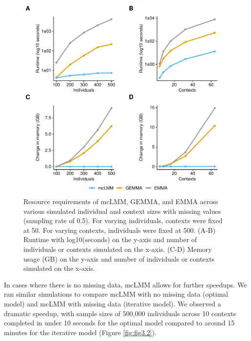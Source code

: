         \begin{figure}
            \centering
            \includegraphics[width=\textwidth]{chapter3/figures/Figure_1.pdf}
            \caption{Resource requirements of mcLMM, GEMMA, and EMMA across various simulated individual and context sizes with missing values (sampling rate of 0.5). For varying individuals, contexts were fixed at 50. For varying contexts, individuals were fixed at 500. (A-B) Runtime with log10(seconds) on the y-axis and number of individuals or contexts simulated on the x-axis. (C-D) Memory usage (GB) on the y-axis and number of individuals or contexts simulated on the x-axis. }
            \label{fig:fig3.1}
        \end{figure}
        
        In cases where there is no missing data, mcLMM allows for further speedups. We ran similar simulations to compare mcLMM with no missing data (optimal model) and mcLMM with missing data (iterative model). We observed a dramatic speedup, with sample sizes of 500,000 individuals across 10 contexts completed in under 10 seconds for the optimal model compared to around 15 minutes for the iterative model (Figure \ref{fig:fig3.2}).
        

